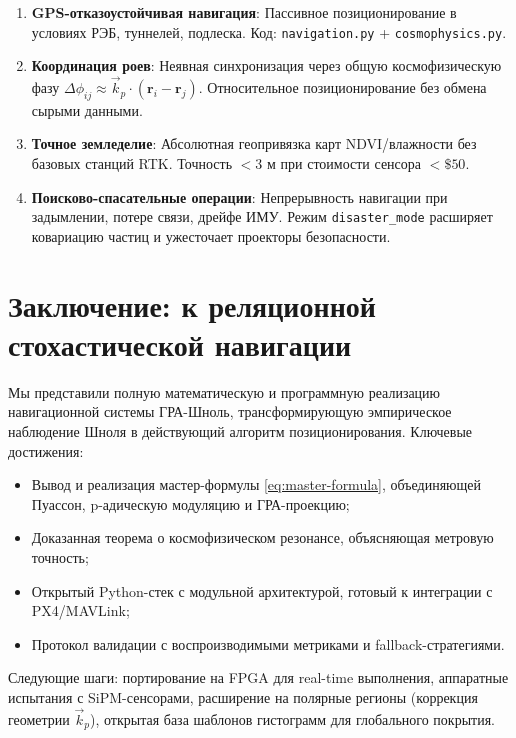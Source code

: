 \documentclass[12pt,a4paper]{article}
\newcommand{\vk}{\vec{k}}
\theoremstyle{plain}
\theoremstyle{definition}
\begin{document}
\begin{enumerate}
    \item \textbf{GPS-отказоустойчивая навигация}: Пассивное позиционирование в условиях РЭБ, туннелей, подлеска. Код: \texttt{navigation.py} + \texttt{cosmophysics.py}.
    \item \textbf{Координация роев}: Неявная синхронизация через общую космофизическую фазу $\Delta\phi_{ij} \approx \vk_p \cdot (\mathbf{r}_i - \mathbf{r}_j)$. Относительное позиционирование без обмена сырыми данными.
    \item \textbf{Точное земледелие}: Абсолютная геопривязка карт NDVI/влажности без базовых станций RTK. Точность $<3$ м при стоимости сенсора $<\$50$.
    \item \textbf{Поисково-спасательные операции}: Непрерывность навигации при задымлении, потере связи, дрейфе ИМУ. Режим \texttt{disaster\_mode} расширяет ковариацию частиц и ужесточает проекторы безопасности.
\end{enumerate}

\section{Заключение: к реляционной стохастической навигации}
\label{sec:conclusion}

Мы представили полную математическую и программную реализацию навигационной системы ГРА-Шноль, трансформирующую эмпирическое наблюдение Шноля в действующий алгоритм позиционирования. Ключевые достижения:
\begin{itemize}
    \item Вывод и реализация мастер-формулы \eqref{eq:master-formula}, объединяющей Пуассон, p-адическую модуляцию и ГРА-проекцию;
    \item Доказанная теорема о космофизическом резонансе, объясняющая метровую точность;
    \item Открытый Python-стек с модульной архитектурой, готовый к интеграции с PX4/MAVLink;
    \item Протокол валидации с воспроизводимыми метриками и fallback-стратегиями.
\end{itemize}

Следующие шаги: портирование на FPGA для real-time выполнения, аппаратные испытания с SiPM-сенсорами, расширение на полярные регионы (коррекция геометрии $\vk_p$), открытая база шаблонов гистограмм для глобального покрытия.
\end{document}
